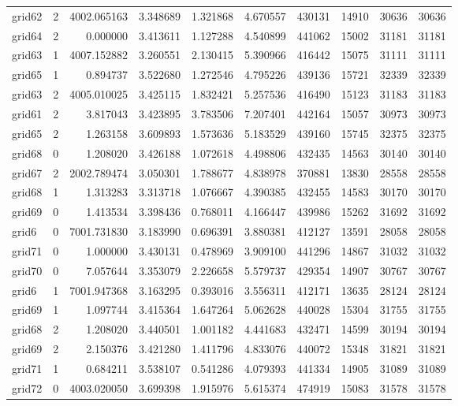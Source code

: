 \begin{longtable}{|l|r|r|r|r|r|r|r|r|r|}
grid62 & 2 & 4002.065163 & 3.348689 & 1.321868 & 4.670557 & 430131 & 14910 & 30636 & 30636 \\
grid64 & 2 & 0.000000 & 3.413611 & 1.127288 & 4.540899 & 441062 & 15002 & 31181 & 31181 \\
grid63 & 1 & 4007.152882 & 3.260551 & 2.130415 & 5.390966 & 416442 & 15075 & 31111 & 31111 \\
grid65 & 1 & 0.894737 & 3.522680 & 1.272546 & 4.795226 & 439136 & 15721 & 32339 & 32339 \\
grid63 & 2 & 4005.010025 & 3.425115 & 1.832421 & 5.257536 & 416490 & 15123 & 31183 & 31183 \\
grid61 & 2 & 3.817043 & 3.423895 & 3.783506 & 7.207401 & 442164 & 15057 & 30973 & 30973 \\
grid65 & 2 & 1.263158 & 3.609893 & 1.573636 & 5.183529 & 439160 & 15745 & 32375 & 32375 \\
grid68 & 0 & 1.208020 & 3.426188 & 1.072618 & 4.498806 & 432435 & 14563 & 30140 & 30140 \\
grid67 & 2 & 2002.789474 & 3.050301 & 1.788677 & 4.838978 & 370881 & 13830 & 28558 & 28558 \\
grid68 & 1 & 1.313283 & 3.313718 & 1.076667 & 4.390385 & 432455 & 14583 & 30170 & 30170 \\
grid69 & 0 & 1.413534 & 3.398436 & 0.768011 & 4.166447 & 439986 & 15262 & 31692 & 31692 \\
grid6 & 0 & 7001.731830 & 3.183990 & 0.696391 & 3.880381 & 412127 & 13591 & 28058 & 28058 \\
grid71 & 0 & 1.000000 & 3.430131 & 0.478969 & 3.909100 & 441296 & 14867 & 31032 & 31032 \\
grid70 & 0 & 7.057644 & 3.353079 & 2.226658 & 5.579737 & 429354 & 14907 & 30767 & 30767 \\
grid6 & 1 & 7001.947368 & 3.163295 & 0.393016 & 3.556311 & 412171 & 13635 & 28124 & 28124 \\
grid69 & 1 & 1.097744 & 3.415364 & 1.647264 & 5.062628 & 440028 & 15304 & 31755 & 31755 \\
grid68 & 2 & 1.208020 & 3.440501 & 1.001182 & 4.441683 & 432471 & 14599 & 30194 & 30194 \\
grid69 & 2 & 2.150376 & 3.421280 & 1.411796 & 4.833076 & 440072 & 15348 & 31821 & 31821 \\
grid71 & 1 & 0.684211 & 3.538107 & 0.541286 & 4.079393 & 441334 & 14905 & 31089 & 31089 \\
grid72 & 0 & 4003.020050 & 3.699398 & 1.915976 & 5.615374 & 474919 & 15083 & 31578 & 31578 \\

\end{longtable}
